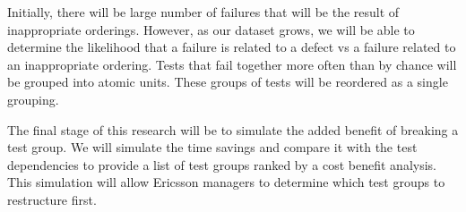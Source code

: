 Initially, there will be large number of failures that will be the result of inappropriate orderings. However, as our dataset grows, we will be able to determine the likelihood that a failure is related to a defect vs a failure related to an inappropriate ordering. Tests that fail together more often than by chance will be grouped into atomic units. These groups of tests will be reordered as a single grouping.

The final stage of this research will be to simulate the added benefit of breaking a test group. We will simulate the time savings and compare it with the test dependencies to provide a list of test groups ranked by a cost benefit analysis. This simulation will allow Ericsson managers to determine which test groups to restructure first.




